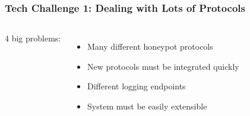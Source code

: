 \begin{frame}
\frametitle{Tech Challenge 1: Dealing with Lots of Protocols}


\begin{columns}[c]

4 big problems:

\begin{itemize}
    \item Many different honeypot protocols
    \item New protocols must be integrated quickly
    \item Different logging endpoints
    \item System must be easily extensible
\end{itemize}


\begin{figure}
\centering
{
\scalebox{0.65}{}
}
\end{figure}

\end{columns}

\end{frame}
